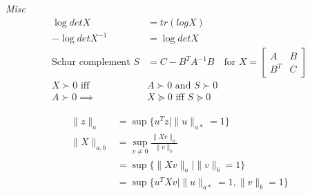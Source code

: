 \noindent
\textit{Misc}\\[5mm]
\begin{align*}
\log det X &= tr(logX)\\
- \log det X^{-1} &= \log det X\\
\mbox{Schur complement } S &= C - B^TA^{-1}B \quad \mbox{for }
X = \begin{bmatrix}  A&B\\B^T&C \end{bmatrix} \\
X \succ 0 \mbox{ iff } &A \succ 0 \mbox{ and } S \succ 0\\
A \succ 0 \implies &X \succeq 0 \mbox{ iff } S \succeq 0
\end{align*}
%
%
\begin{table}[ht]
\end{table}

\begin{align*}
\|z\|_a &= \sup\{u^T z | \|u\|_{a*} = 1\}\\
\|X\|_{a,b}  &= \sup_{v \ne 0} \frac{\|Xv\|_a}{\|v\|_b}\\
&=\sup \{\|Xv\|_a | \|v\|_b = 1\}\\
&=\sup \{ u^TXv | \|u\|_{a*} = 1, \|v\|_b = 1\}
\end{align*}

